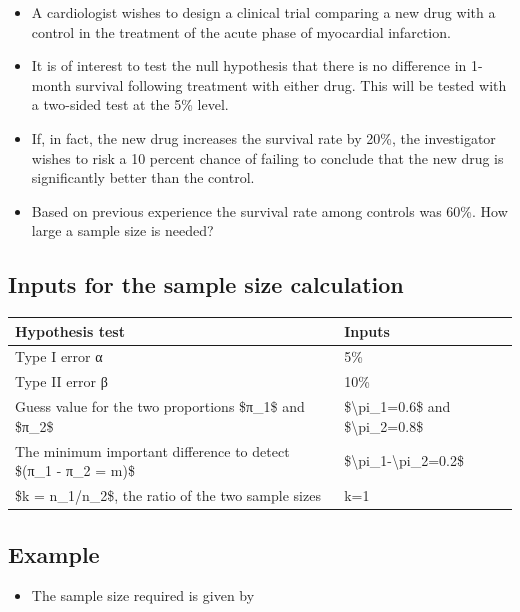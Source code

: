 \documentclass[
]{book}
\providecommand{\tightlist}{%
  \setlength{\itemsep}{0pt}\setlength{\parskip}{0pt}}
\begin{document}
\begin{itemize}
\tightlist
\item
  A cardiologist wishes to design a clinical trial comparing a new drug with a control in the treatment of the acute phase of myocardial infarction.
\item
  It is of interest to test the null hypothesis that there is no difference in 1-month survival following treatment with either drug. This will be tested with a two-sided test at the 5\% level.
\item
  If, in fact, the new drug increases the survival rate by 20\%, the investigator wishes to risk a 10 percent chance of failing to conclude that the new drug is significantly better than the control.
\item
  Based on previous experience the survival rate among controls was 60\%. How large a sample size is needed?
\end{itemize}

\hypertarget{inputs-for-the-sample-size-calculation}{%
\subsection{Inputs for the sample size calculation}\label{inputs-for-the-sample-size-calculation}}

\begin{tabular}{l|l}
\hline
Hypothesis test & Inputs\\
\hline
Type I error α & 5\%\\
\hline
Type II error β & 10\%\\
\hline
Guess value for the two proportions \$π\_1\$ and \$π\_2\$ & \$\textbackslash{}pi\_1=0.6\$ and \$\textbackslash{}pi\_2=0.8\$\\
\hline
The minimum important difference to detect \$(π\_1 - π\_2 = m)\$ & \$\textbackslash{}pi\_1-\textbackslash{}pi\_2=0.2\$\\
\hline
\$k = n\_1/n\_2\$, the ratio of the two sample sizes & k=1\\
\hline
\end{tabular}

\hypertarget{example-7}{%
\subsection{Example}\label{example-7}}

\begin{itemize}
\tightlist
\item
  The sample size required is given by
\end{itemize}
\end{document}
